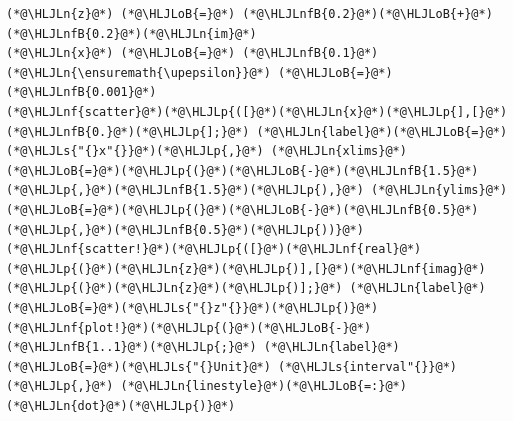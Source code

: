 \documentclass[12pt,a4paper]{article}
\newcommand{\HLJLn}[1]{#1}
\newcommand{\HLJLnf}[1]{\textcolor[RGB]{66,102,213}{#1}}
\newcommand{\HLJLs}[1]{\textcolor[RGB]{201,61,57}{#1}}
\newcommand{\HLJLnfB}[1]{\textcolor[RGB]{59,151,46}{#1}}
\newcommand{\HLJLoB}[1]{\textcolor[RGB]{102,102,102}{\textbf{#1}}}
\newcommand{\HLJLp}[1]{#1}
\def\upepsilon{\varepsilon}
\begin{document}
\begin{lstlisting}
(*@\HLJLn{z}@*) (*@\HLJLoB{=}@*) (*@\HLJLnfB{0.2}@*)(*@\HLJLoB{+}@*)(*@\HLJLnfB{0.2}@*)(*@\HLJLn{im}@*)
(*@\HLJLn{x}@*) (*@\HLJLoB{=}@*) (*@\HLJLnfB{0.1}@*)
(*@\HLJLn{\ensuremath{\upepsilon}}@*) (*@\HLJLoB{=}@*) (*@\HLJLnfB{0.001}@*)
(*@\HLJLnf{scatter}@*)(*@\HLJLp{([}@*)(*@\HLJLn{x}@*)(*@\HLJLp{],[}@*)(*@\HLJLnfB{0.}@*)(*@\HLJLp{];}@*) (*@\HLJLn{label}@*)(*@\HLJLoB{=}@*)(*@\HLJLs{"{}x"{}}@*)(*@\HLJLp{,}@*) (*@\HLJLn{xlims}@*)(*@\HLJLoB{=}@*)(*@\HLJLp{(}@*)(*@\HLJLoB{-}@*)(*@\HLJLnfB{1.5}@*)(*@\HLJLp{,}@*)(*@\HLJLnfB{1.5}@*)(*@\HLJLp{),}@*) (*@\HLJLn{ylims}@*)(*@\HLJLoB{=}@*)(*@\HLJLp{(}@*)(*@\HLJLoB{-}@*)(*@\HLJLnfB{0.5}@*)(*@\HLJLp{,}@*)(*@\HLJLnfB{0.5}@*)(*@\HLJLp{))}@*)
(*@\HLJLnf{scatter!}@*)(*@\HLJLp{([}@*)(*@\HLJLnf{real}@*)(*@\HLJLp{(}@*)(*@\HLJLn{z}@*)(*@\HLJLp{)],[}@*)(*@\HLJLnf{imag}@*)(*@\HLJLp{(}@*)(*@\HLJLn{z}@*)(*@\HLJLp{)];}@*) (*@\HLJLn{label}@*)(*@\HLJLoB{=}@*)(*@\HLJLs{"{}z"{}}@*)(*@\HLJLp{)}@*)
(*@\HLJLnf{plot!}@*)(*@\HLJLp{(}@*)(*@\HLJLoB{-}@*)(*@\HLJLnfB{1..1}@*)(*@\HLJLp{;}@*) (*@\HLJLn{label}@*)(*@\HLJLoB{=}@*)(*@\HLJLs{"{}Unit}@*) (*@\HLJLs{interval"{}}@*)(*@\HLJLp{,}@*) (*@\HLJLn{linestyle}@*)(*@\HLJLoB{=:}@*)(*@\HLJLn{dot}@*)(*@\HLJLp{)}@*)


\end{lstlisting}
\end{document}

